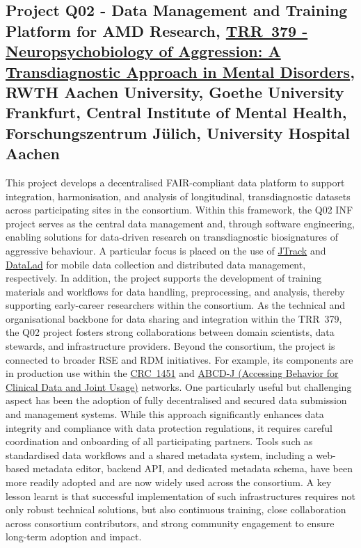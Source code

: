 \documentclass{eceasst}
\begin{document}
\subsection{Project Q02 - Data Management and Training Platform for AMD Research, \href{https://gepris.dfg.de/gepris/projekt/512007073?language=en}{TRR~379 - Neuropsychobiology of Aggression: A Transdiagnostic Approach in Mental Disorders}, RWTH Aachen University, Goethe University Frankfurt, Central Institute of Mental Health, Forschungszentrum Jülich, University Hospital Aachen}

This project develops a decentralised FAIR-compliant data platform to support integration, harmonisation, and analysis of longitudinal, transdiagnostic datasets across participating sites in the consortium.
Within this framework, the Q02 INF project serves as the central data management and, through software engineering, enabling solutions for data-driven research on transdiagnostic biosignatures of aggressive behaviour.
A particular focus is placed on the use of
\href{https://jtrack.readthedocs.io/en/latest/index.html}{JTrack}
and
\href{https://www.datalad.org/)}{DataLad}
for mobile data collection and distributed data management, respectively.
In addition, the project supports the development of training materials and workflows for data handling, preprocessing, and analysis, thereby supporting early-career researchers within the consortium.
As the technical and organisational backbone for data sharing and integration within the TRR~379, the Q02 project fosters strong collaborations between domain scientists, data stewards, and infrastructure providers.
Beyond the consortium, the project is connected to broader RSE and RDM initiatives.
For example, its components are in production use within the
\href{https://www.crc1451.uni-koeln.de/}{CRC~1451}
and
\href{https://abcd-j.de/}{ABCD-J (Accessing Behavior for Clinical Data and Joint Usage)}
networks.
One particularly useful but challenging aspect has been the adoption of fully decentralised and secured data submission and management systems.
While this approach significantly enhances data integrity and compliance with data protection regulations, it requires careful coordination and onboarding of all participating partners.
Tools such as standardised data workflows and a shared metadata system, including a web-based metadata editor, backend API, and dedicated metadata schema, have been more readily adopted and are now widely used across the consortium.
A key lesson learnt is that successful implementation of such infrastructures requires not only robust technical solutions, but also continuous training, close collaboration across consortium contributors, and strong community engagement to ensure long-term adoption and impact.
\end{document}
